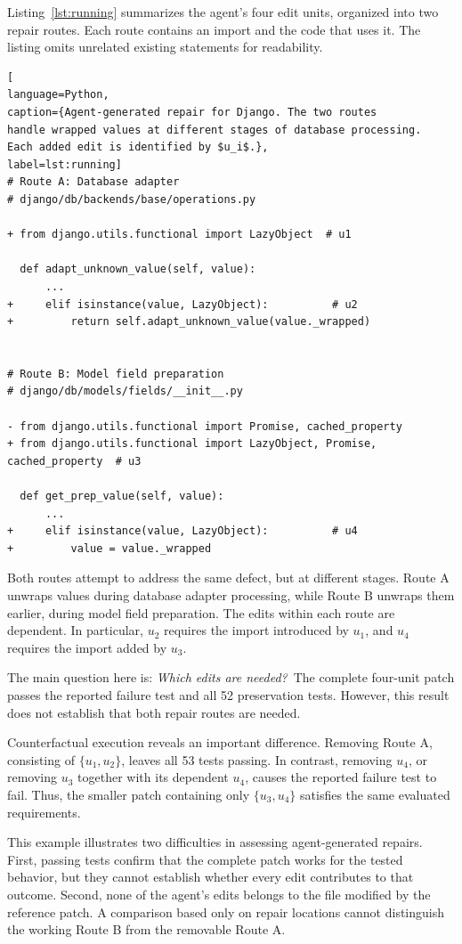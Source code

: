 \documentclass[a4paper,fleqn]{cas-sc}
\begin{document}
Listing~\ref{lst:running} summarizes the agent's four edit units,
organized into two repair routes. Each route contains an import
and the code that uses it. The listing omits unrelated existing
statements for readability.

\begin{lstlisting}[
language=Python,
caption={Agent-generated repair for Django. The two routes
handle wrapped values at different stages of database processing.
Each added edit is identified by $u_i$.},
label=lst:running]
# Route A: Database adapter
# django/db/backends/base/operations.py

+ from django.utils.functional import LazyObject  # u1

  def adapt_unknown_value(self, value):
      ...
+     elif isinstance(value, LazyObject):          # u2
+         return self.adapt_unknown_value(value._wrapped)


# Route B: Model field preparation
# django/db/models/fields/__init__.py

- from django.utils.functional import Promise, cached_property
+ from django.utils.functional import LazyObject, Promise, cached_property  # u3

  def get_prep_value(self, value):
      ...
+     elif isinstance(value, LazyObject):          # u4
+         value = value._wrapped
\end{lstlisting}

Both routes attempt to address the same defect, but at different
stages. Route A unwraps values during database adapter processing,
while Route B unwraps them earlier, during model field preparation.
The edits within each route are dependent. In particular, $u_2$
requires the import introduced by $u_1$, and $u_4$ requires the
import added by $u_3$.

The main question here is: \textit{Which edits are needed?}~The complete four-unit patch passes the reported failure test
and all 52 preservation tests. However, this result does not
establish that both repair routes are needed.

Counterfactual execution reveals an important difference.
Removing Route A, consisting of $\{u_1,u_2\}$, leaves all 53
tests passing. In contrast, removing $u_4$, or removing $u_3$
together with its dependent $u_4$, causes the reported failure
test to fail. Thus, the smaller patch containing only
$\{u_3,u_4\}$ satisfies the same evaluated requirements.

This example illustrates two difficulties in assessing
agent-generated repairs. First, passing tests confirm that the
complete patch works for the tested behavior, but they cannot
establish whether every edit contributes to that outcome.
Second, none of the agent's edits belongs to the file modified
by the reference patch. A comparison based only on repair
locations cannot distinguish the working Route B from the
removable Route A.
\end{document}
